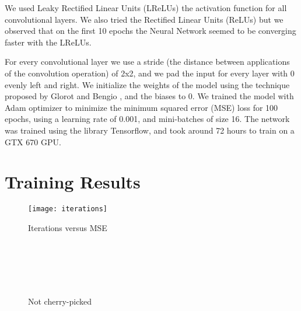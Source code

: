 We used Leaky Rectified Linear Units (LReLUs) the activation function for all convolutional layers. We also tried the Rectified Linear Units (ReLUs) but we observed that on the first 10 epochs the Neural Network seemed to be converging faster with the LReLUs. 

For every convolutional layer we use a stride (the distance between applications of the convolution operation) of 2x2, and we pad the input for every layer with 0  evenly left and right. We initialize the weights of the model using the technique proposed by Glorot and Bengio \cite{glorot2010understanding}, and the biases to 0. We trained the model with Adam optimizer to minimize the minimum squared error (MSE) loss for 100 epochs, using a learning rate of 0.001, and mini-batches of size 16. The network was trained using the library Tensorflow, and took around 72 hours to train on a GTX 670 GPU.

\section{Training Results}

\begin{figure}[!htb]
\centering
\texttt{[image: iterations]}
\caption{Iterations versus MSE}
\label{fig:trainingMSE}

\end{figure}

\begin{figure}[!htpb]
\centering
{} 
\hspace*{0.4in} %
\\
\hspace*{0.4in} %
\\
\hspace*{0.4in} %
\\
\hspace*{0.4in} %
\\
\addtocounter{subfigure}{-8}
\hspace*{0.4in} %




\caption{Not cherry-picked} \label{fig:resultingsamples}
\end{figure}

